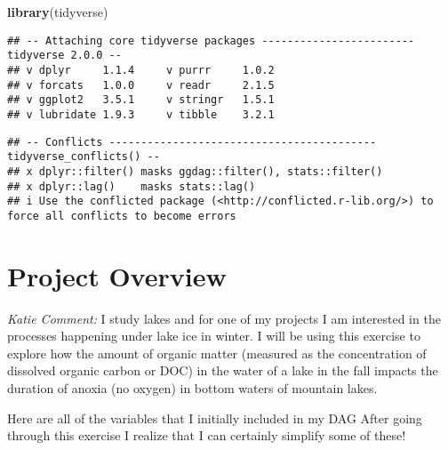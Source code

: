 \documentclass[
]{article}
\newenvironment{Shaded}{\begin{snugshade}}{\end{snugshade}}
\newcommand{\FunctionTok}[1]{\textcolor[rgb]{0.13,0.29,0.53}{\textbf{#1}}}
\newcommand{\NormalTok}[1]{#1}
\begin{document}
\begin{Shaded}
\begin{Highlighting}[]
\FunctionTok{library}\NormalTok{(tidyverse)}
\end{Highlighting}
\end{Shaded}

\begin{verbatim}
## -- Attaching core tidyverse packages ------------------------ tidyverse 2.0.0 --
## v dplyr     1.1.4     v purrr     1.0.2
## v forcats   1.0.0     v readr     2.1.5
## v ggplot2   3.5.1     v stringr   1.5.1
## v lubridate 1.9.3     v tibble    3.2.1
\end{verbatim}

\begin{verbatim}
## -- Conflicts ------------------------------------------ tidyverse_conflicts() --
## x dplyr::filter() masks ggdag::filter(), stats::filter()
## x dplyr::lag()    masks stats::lag()
## i Use the conflicted package (<http://conflicted.r-lib.org/>) to force all conflicts to become errors
\end{verbatim}

\section{Project Overview}\label{project-overview}

{ \emph{Katie Comment:} I study lakes and for one of my projects I am
interested in the processes happening under lake ice in winter. I will
be using this exercise to explore how the amount of organic matter
(measured as the concentration of dissolved organic carbon or DOC) in
the water of a lake in the fall impacts the duration of anoxia (no
oxygen) in bottom waters of mountain lakes. }

{ Here are all of the variables that I initially included in my DAG
After going through this exercise I realize that I can certainly
simplify some of these! }
\end{document}
